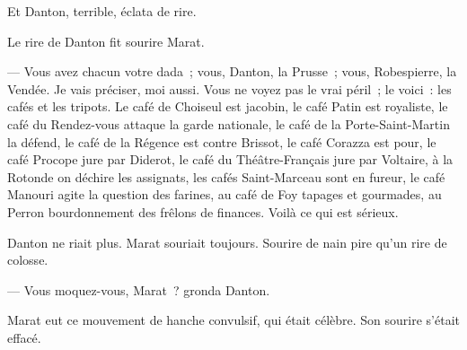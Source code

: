 \documentclass[french,twoside]{book} %
\begin{document}
Et Danton, terrible, éclata de rire.\par
Le rire de Danton fit sourire Marat.\par
— Vous avez chacun votre dada ; vous, Danton, la Prusse ; vous, Robespierre, la Vendée. Je vais préciser, moi aussi. Vous ne voyez pas le vrai péril ; le voici : les cafés et les tripots. Le café de Choiseul est jacobin, le café Patin est royaliste, le café du Rendez-vous attaque la garde nationale, le café de la Porte-Saint-Martin la défend, le café de la Régence est contre Brissot, le café Corazza est pour, le café Procope jure par Diderot, le café du Théâtre-Français jure par Voltaire, à la Rotonde on déchire les assignats, les cafés Saint-Marceau sont en fureur, le café Manouri agite la question des farines, au café de Foy tapages et gourmades, au Perron bourdonnement des frêlons de finances. Voilà ce qui est sérieux.\par
 Danton ne riait plus. Marat souriait toujours. Sourire de nain pire qu’un rire de colosse.\par
— Vous moquez-vous, Marat ? gronda Danton.\par
Marat eut ce mouvement de hanche convulsif, qui était célèbre. Son sourire s’était effacé.\par
\end{document}
